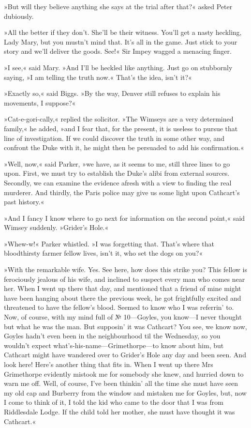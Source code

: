 »But will they believe anything she says at the trial after that?« asked Peter dubiously.

»All the better if they don't. She'll be their witness. You'll get a nasty heckling, Lady Mary, but you mustn't mind that. It's all in the game. Just stick to your story and we'll deliver the goods. See!« Sir Impey wagged a menacing finger.

»I see,« said Mary. »And I'll be heckled like anything. Just go on stubbornly saying, »I am telling the truth now.« That's the idea, isn't it?«

»Exactly so,« said Biggs. »By the way, Denver still refuses to explain his movements, I suppose?«

»Cat-e-gori-cally,« replied the solicitor. »The Wimseys are a very determined family,« he added, »and I fear that, for the present, it is useless to pursue that line of investigation. If we could discover the truth in some other way, and confront the Duke with it, he might then be persuaded to add his confirmation.«

»Well, now,« said Parker, »we have, as it seems to me, still three lines to go upon. First, we must try to establish the Duke's alibi from external sources. Secondly, we can examine the evidence afresh with a view to finding the real murderer. And thirdly, the Paris police may give us some light upon Cathcart's past history.«

»And I fancy I know where to go next for information on the second point,« said Wimsey suddenly. »Grider's Hole.«

»Whew-w!« Parker whistled. »I was forgetting that. That's where that bloodthirsty farmer fellow lives, isn't it, who set the dogs on you?«

»With the remarkable wife. Yes. See here, how does this strike you?  This fellow is ferociously jealous of his wife, and inclined to suspect every man who comes near her. When I went up there that day, and mentioned that a friend of mine might have been hanging about there the previous week, he got frightfully excited and threatened to have the fellow's blood. Seemed to know who I was referrin' to. Now, of course, with my mind full of № 10\allowbreak---\allowbreak Goyles, you know\allowbreak---\allowbreak I never thought but what he was the man. But supposin' it was Cathcart? You see, we know now, Goyles hadn't even been in the neighbourhood til the Wednesday, so you wouldn't expect what's-his-name\allowbreak---\allowbreak Grimethorpe---to know about him, but Cathcart might have wandered over to Grider's Hole any day and been seen. And look here! Here's another thing that fits in. When I went up there Mrs Grimethorpe evidently mistook me for somebody she knew, and hurried down to warn me off. Well, of course, I've been thinkin' all the time she must have seen my old cap and Burberry from the window and mistaken me for Goyles, but, now I come to think of it, I told the kid who came to the door that I was from Riddlesdale Lodge. If the child told her mother, she must have thought it was Cathcart.«

